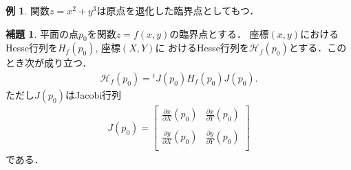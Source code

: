 \documentclass[11pt, a4paper, dvipdfmx]{jsarticle}
\theoremstyle{definition}
\newcommand{\mcal}{\mathcal}
\newcommand{\HH}{\mcal{H}}
\newcommand{\p}{\partial}
\newcommand{\dip}{\displaystyle} %
\theoremstyle{mystyle}
\newtheorem{LMM}[Axiom]{補題}
\newtheorem{EG}[Axiom]{例}
\numberwithin{equation}{section} %
\begin{document}
\begin{EG}
    関数$z=x^2+y^3$は原点を退化した臨界点としてもつ．
\end{EG}

\begin{LMM}
    平面の点$p_0$を関数$z=f(x,y)$の臨界点とする．
    座標$(x,y)$におけるHesse行列を$H_f(p_0)$, 座標$(X,Y)$に
    おけるHesse行列を$\HH_f(p_0)$とする．このとき次が成り立つ．
    \begin{align}
        \HH_f(p_0)={}^tJ(p_0)H_f(p_0)J(p_0).
    \end{align}
    ただし$J(p_0)$はJacobi行列
    \begin{align}
        J(p_0)=
        \begin{bmatrix*}
            \dip \frac{\p x}{\p X}(p_0)   &\dip\frac{\p x}{\p Y}(p_0)\\\\
            \dip \frac{\p y}{\p X}(p_0) &\dip \frac{\p y}{\p Y}(p_0)\\
        \end{bmatrix*}
        \label{eq:jacbiMet}
    \end{align}
    である．
\end{LMM}
\end{document}
